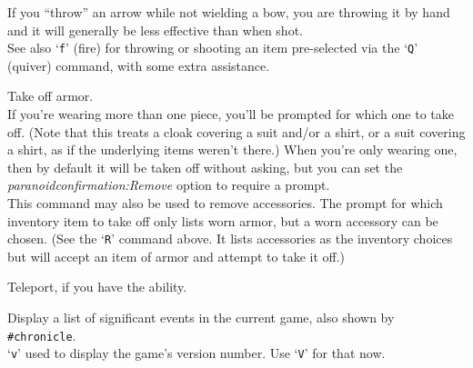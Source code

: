 \documentclass[titlepage]{article}
\begin{document}
\begin{description}[font=\mdseries\ttfamily]
If you ``throw'' an arrow while not wielding a bow, you are throwing
it by hand and it will generally be less effective than when shot.\\
See also `\texttt{f}' (fire) for throwing or shooting an item pre-selected
via the `\texttt{Q}' (quiver) command, with some extra assistance.
\item[T]
Take off armor.\\
If you're wearing more than one piece, you'll be prompted for which
one to take off.  (Note that this treats a cloak covering a suit
and/or a shirt, or a suit covering a shirt, as if the underlying items
weren't there.)
When you're only wearing one, then by default it will
be taken off without asking, but you can set the
\textit{paranoid\textunderscore confirmation:Remove}
option to require a prompt.\\
This command may also be used to remove accessories.  The prompt
for which inventory item to take off only lists worn armor, but a worn
accessory can be chosen.
(See the `\texttt{R}' command above.  It lists accessories as the inventory
choices but will accept an item of armor and attempt to take it off.)
\item[\textasciicircum T]
Teleport, if you have the ability.
\item[v]
Display a list of significant events in the current game, also shown by
\texttt{\#chronicle}.
\\
`\texttt{v}' used to display the game's version number.
Use `\texttt{V}' for that now.


\end{description}
\end{document}
